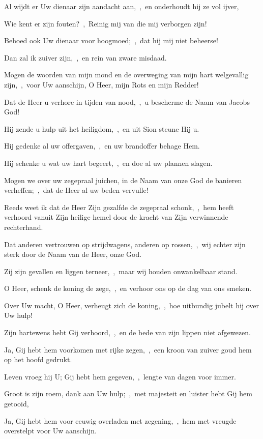 \documentclass[12pt,twoside,a5paper]{article}
\begin{document}
\begin{halfparskip}
  Al wijdt er Uw dienaar zijn aandacht aan,~\sep\ en onderhoudt hij ze vol ijver,

  Wie kent er zijn fouten?~\sep\ Reinig mij van die mij verborgen zijn!

  Behoed ook Uw dienaar voor hoogmoed;~\sep\ dat hij mij niet beheerse!

  Dan zal ik zuiver zijn,~\sep\ en rein van zware misdaad.

  Mogen de woorden van mijn mond en de overweging van mijn hart welgevallig zijn,~\sep\ voor Uw aanschijn, O Heer, mijn Rots en mijn Redder!

   Dat de Heer u verhore in tijden van nood,~\sep\ u bescherme de Naam van Jacobs God!

  Hij zende u hulp uit het heiligdom,~\sep\ en uit Sion steune Hij u.

  Hij gedenke al uw offergaven,~\sep\ en uw brandoffer behage Hem.

  Hij schenke u wat uw hart begeert,~\sep\ en doe al uw plannen slagen.

  Mogen we over uw zegepraal juichen, in de Naam van onze God de banieren verheffen;~\sep\ dat de Heer al uw beden vervulle!

  Reeds weet ik dat de Heer Zijn gezalfde de zegepraal schonk,~\sep\ hem heeft verhoord vanuit Zijn heilige hemel door de kracht van Zijn verwinnende rechterhand.

  Dat anderen vertrouwen op strijdwagens, anderen op rossen,~\sep\ wij echter zijn sterk door de Naam van de Heer, onze God.

  Zij zijn gevallen en liggen terneer,~\sep\ maar wij houden onwankelbaar stand.

  O Heer, schenk de koning de zege,~\sep\ en verhoor ons op de dag van ons smeken.

   Over Uw macht, O Heer, verheugt zich de koning,~\sep\ hoe uitbundig jubelt hij over Uw hulp!

  Zijn hartewens hebt Gij verhoord,~\sep\ en de bede van zijn lippen niet afgewezen.

  Ja, Gij hebt hem voorkomen met rijke zegen,~\sep\ een kroon van zuiver goud hem op het hoofd gedrukt.

  Leven vroeg hij U; Gij hebt hem gegeven,~\sep\ lengte van dagen voor immer.

  Groot is zijn roem, dank aan Uw hulp;~\sep\ met majesteit en luister hebt Gij hem getooid,

  Ja, Gij hebt hem voor eeuwig overladen met zegening,~\sep\ hem met vreugde overstelpt voor Uw aanschijn.


\end{halfparskip}
\end{document}
